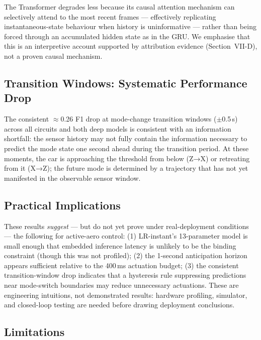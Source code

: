 \documentclass[conference,a4paper]{IEEEtran}
\begin{document}
The Transformer degrades less because its causal attention mechanism can selectively
attend to the most recent frames — effectively replicating instantaneous-state behaviour
when history is uninformative — rather than being forced through an accumulated hidden
state as in the GRU. We emphasise that this is an interpretive account supported by
attribution evidence (Section~VII-D), not a proven causal mechanism.

\subsection{Transition Windows: Systematic Performance Drop}

The consistent $\approx$0.26 F1 drop at mode-change transition windows ($\pm$0.5\,s)
across all circuits and both deep models is consistent with an information shortfall:
the sensor history may not fully contain the information necessary to predict
the mode state one second ahead during the transition period.
At these moments, the car is approaching the threshold from below (Z→X) or retreating
from it (X→Z); the future mode is determined by a trajectory that has not yet
manifested in the observable sensor window.

\subsection{Practical Implications}

These results \emph{suggest} — but do not yet prove under real-deployment conditions —
the following for active-aero control: (1) LR-instant's 13-parameter model is small enough
that embedded inference latency is unlikely to be the binding constraint (though this was
not profiled); (2) the 1-second anticipation horizon appears sufficient relative to the
400\,ms actuation budget; (3) the consistent transition-window drop indicates that a
hysteresis rule suppressing predictions near mode-switch boundaries may reduce unnecessary
actuations.
These are engineering intuitions, not demonstrated results: hardware profiling, simulator,
and closed-loop testing are needed before drawing deployment conclusions.

\subsection{Limitations}
\end{document}
